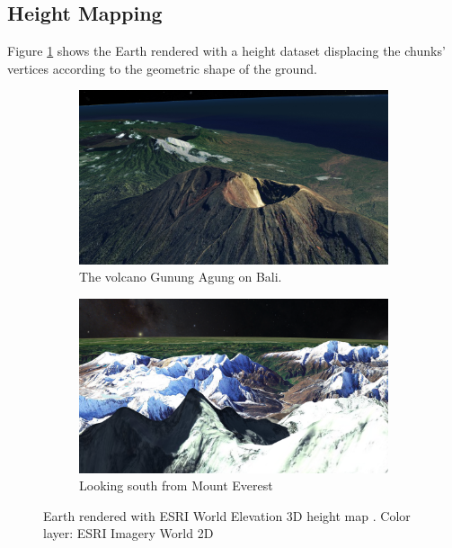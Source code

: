 \subsection{Height Mapping}
\FloatBarrier
Figure \ref{fig:resheightmapping} shows the Earth rendered with a height dataset displacing the chunks' vertices according to the geometric shape of the ground.
\begin{figure}[h]
    \centering
    \begin{subfigure}[bt]{0.8\textwidth}
        \includegraphics[width=\textwidth]{figures/results/screenshots/height_bali.png}
        \caption{The volcano Gunung Agung on Bali.}
    \end{subfigure}
    \par\bigskip
    \begin{subfigure}[bt]{0.8\textwidth}
        \includegraphics[width=\textwidth]{figures/results/screenshots/height_mt_everest.png}
        \caption{Looking south from Mount Everest}
    \end{subfigure}
    \caption{Earth rendered with ESRI World Elevation 3D height map \cite{worldelevation3d}. Color layer: ESRI Imagery World 2D \cite{imageryworld2d}}
    \label{fig:resheightmapping}
\end{figure}

